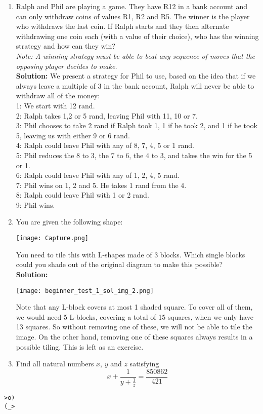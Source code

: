 \documentclass{article}
\begin{document}
\begin{enumerate}[1.]
\item Ralph and Phil are playing a game. They have R12 in a bank account and can only withdraw coins of values R1, R2 and R5. The winner is the player who withdraws the last coin. If Ralph starts and they then alternate withdrawing one coin each (with a value of their choice), who has the winning strategy and how can they win?\\
\textit{Note: A winning strategy must be able to beat any sequence of moves that the opposing player decides to make.}\\

\textbf{Solution:}
We present a strategy for Phil to use, based on the idea that if we always leave a multiple of 3 in the bank account, Ralph will never be able to withdraw all of the money:\\
1: We start with 12 rand.\\
2: Ralph takes 1,2 or 5 rand, leaving Phil with 11, 10 or 7.\\
3: Phil chooses to take 2 rand if Ralph took 1, 1 if he took 2, and 1 if he took 5, leaving us with either 9 or 6 rand.\\
4: Ralph could leave Phil with any of 8, 7, 4, 5 or 1 rand.\\
5: Phil reduces the 8 to 3, the 7 to 6, the 4 to 3, and takes the win for the 5 or 1.\\
6: Ralph could leave Phil with any of 1, 2, 4, 5 rand.\\
7: Phil wins on 1, 2 and 5. He takes 1 rand from the 4.\\
8: Ralph could leave Phil with 1 or 2 rand.\\
9: Phil wins.\\



\item You are given the following shape: %
\begin{center}
	\texttt{[image: Capture.png]}	
\end{center}
	You need to tile this with L-shapes made of 3 blocks. Which single blocks could you shade out of the original diagram to make this possible?\\
	
\textbf{Solution:}\\
\begin{center}
	\texttt{[image: beginner\_test\_1\_sol\_img\_2.png]}	
\end{center}
Note that any L-block covers at most 1 shaded square. To cover all of them, we would need 5 L-blocks, covering a total of 15 squares, when we only have 13 squares. So without removing one of these, we will not be able to tile the image. On the other hand, removing one of these squares always results in a possible tiling. This is left as an exercise.


\item %
Find all natural numbers $x$, $y$ and $z$ satisfying 
$$x + \frac{1}{y + \frac{1}{z}} = \frac{850862}{421}$$


\end{enumerate}


\vfill
\centering
\begin{BVerbatim}
>o)
(_>
\end{BVerbatim}
\end{document}
